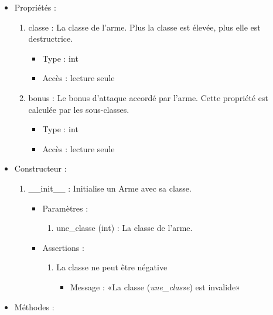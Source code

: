\documentclass[12pt,pdftex,oneside]{article}
\begin{document}
  \begin{itemize}
  \item Propriétés : 
    \begin{enumerate}
    \item classe : La classe de l'arme. Plus la classe est élevée, plus elle est destructrice.
          \begin{itemize}
          \item Type : int
          \item Accès : lecture seule
          \end{itemize}
    \item bonus : Le bonus d'attaque accordé par l'arme. Cette propriété est
      calculée par les sous-classes.
          \begin{itemize}
          \item Type : int
          \item Accès : lecture seule
          \end{itemize}

    \end{enumerate}

  \item Constructeur : 

  \begin{enumerate}
  \item \_\_init\_\_ : Initialise un Arme avec sa classe.
    \begin{itemize}
    \item Paramètres : 
      \begin{enumerate}
      \item une\_classe (int) : La classe de l'arme.
      \end{enumerate}
      \item Assertions : 
        \begin{enumerate}
        \item La classe ne peut être négative
          \begin{itemize}
          \item Message : «La classe (\emph{une\_classe}) est invalide»
          \end{itemize}
        \end{enumerate}
    \end{itemize}

  \end{enumerate}

  \item Méthodes : 


\end{itemize}
\end{document}
